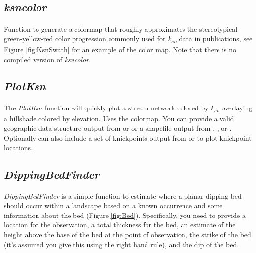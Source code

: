 \subsection{\textit{ksncolor}} \label{sec:ksncolor}
\paragraph{}Function to generate a colormap that roughly approximates the stereotypical green-yellow-red color progression commonly used for \textit{k\textsubscript{sn}} data in publications, see Figure \ref{fig:KsnSwath} for an example of the color map. Note that there is no compiled version of \textit{ksncolor}.

\subsection{\textit{PlotKsn}} \label{sec:plotksn}
\paragraph{}The \textit{PlotKsn} function will quickly plot a stream network colored by \textit{k\textsubscript{sn}} overlaying a hillshade colored by elevation. Uses the  colormap. You can provide a valid geographic data structure output from  or   or a shapefile output from , , or  . Optionally can also include a set of knickpoints output from  or  to plot knickpoint locations. 

\subsection{\textit{DippingBedFinder}} \label{sec:BedFinder}
\paragraph{}\textit{DippingBedFinder} is a simple function to estimate where a planar dipping bed should occur within a landscape based on a known occurrence and some information about the bed (Figure \ref{fig:Bed}). Specifically, you need to provide a location for the observation, a total thickness for the bed, an estimate of the height above the base of the bed at the point of observation, the strike of the bed (it's assumed you give this using the right hand rule), and the dip of the bed. 

